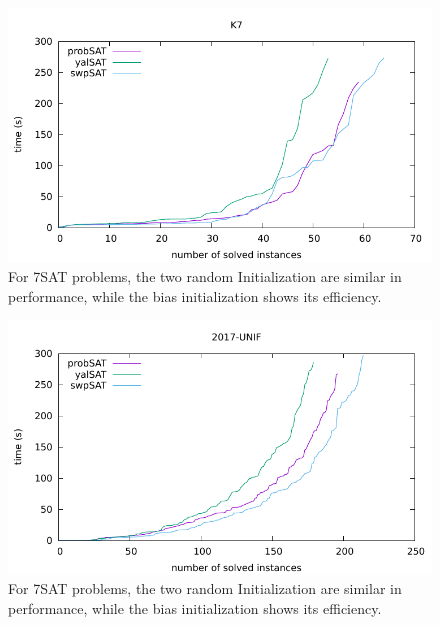 \documentclass[12pt,a4paper,twoside]{scrartcl}
\numberwithin{equation}{section}
\begin{document}
  \begin{figure}[H]
\begin{center}
  \includegraphics[scale = 1]{DATA/K7/e5.pdf}
  \end{center}
  \caption{For 7SAT problems, the two random Initialization are similar in performance, while the bias initialization shows its efficiency.}
  \label{Experiment 9 k7 cactus plot}
  \end{figure} 
  \begin{figure}[H]
\begin{center}
  \includegraphics[scale = 1]{DATA/UNIF/e5.pdf}
  \end{center}
  \caption{For 7SAT problems, the two random Initialization are similar in performance, while the bias initialization shows its efficiency.}
  \label{Experiment 9 all cactus plot}
  \end{figure} 
\end{document}
